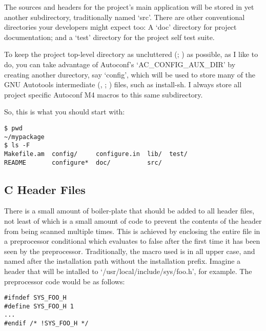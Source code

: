 The sources and headers for the project's main application will be stored in yet another subdirectory, traditionally named `src'. There are other conventional directories your developers might expect too: A `doc' directory for project documentation; and a `test' directory for the project self test suite. 


To keep the project top-level directory as uncluttered ({\MaQ{}}; {\MbQ{}})
as possible, as I like to do, you can take advantage of
Autoconf's `AC\_{}CONFIG\_{}AUX\_{}DIR' by creating another durectory,
say `config', which will be used to store many of the GNU Autotools 
intermediate ({\MaQ{}}, {\MbQ{}}; {\MaQ{}}) files, such as install-sh. I always
store all project specific Autoconf M4 macros to this same subdirectory. 


So, this is what you should start with:

\begin{Verbatim}[frame=single]
$ pwd
~/mypackage
$ ls -F
Makefile.am  config/     configure.in  lib/  test/
README       configure*  doc/          src/
\end{Verbatim}

\subsection{C Header Files}\label{chf}


There is a small amount of boiler-plate that should be added to all header files, not least of which is a small amount of code to prevent the contents of the header from being scanned multiple times. This is achieved by enclosing the entire file in a preprocessor conditional which evaluates to false after the first time it has been seen by the preprocessor. Traditionally, the macro used is in all upper case, and named after the installation path without the installation prefix. Imagine a header that will be intalled to `/usr/local/include/sys/foo.h', for example. The preprocessor code would be as follows: 


\begin{Verbatim}[frame=single]
#ifndef SYS_FOO_H
#define SYS_FOO_H 1
...
#endif /* !SYS_FOO_H */
\end{Verbatim}



